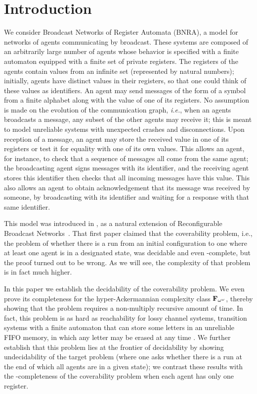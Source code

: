 \section{Introduction}

We consider Broadcast Networks of Register Automata (BNRA), a model for networks of agents communicating by broadcast. These systems are composed of an arbitrarily large number of agents whose behavior is specified with a finite automaton equipped with a finite set of private registers. The registers of the agents contain values from an infinite set (represented by natural numbers); initially, agents have distinct values in their registers, so that one could think of these values as identifiers. An agent may send messages of the form of a symbol from a finite alphabet along with the value of one of its registers. No assumption is made on the evolution of the communication graph, \emph{i.e.}, when an agents broadcasts a message, any subset of the other agents may receive it; this is meant to model unreliable systems with unexpected crashes and disconnections. Upon reception of a message, an agent may store the received value in one of its registers or test it for equality with one of its own values. 
This allows an agent, for instance, to check that a sequence of messages all come from the same agent; the broadcasting agent signs messages with its identifier, and the receiving agent stores this identifier then checks that all incoming messages have this value. This also allows an agent to obtain acknowledgement that its message was received by someone, by broadcasting with its identifier and waiting for a response with that same identifier.

This model was introduced in \cite{DelzannoST13}, as a natural extension of Reconfigurable Broadcast Networks~\cite{DelzannoSZ2010Adhoc}. That first paper claimed that the coverability problem, i.e., the problem of whether there is a run from an initial configuration to one where at least one agent is in a designated state, was decidable and even \PSPACE-complete, but the proof turned out to be wrong. As we will see, the complexity of that problem is in fact much higher.

In this paper we establish the decidability of the coverability problem. We even prove its completeness for the hyper-Ackermannian complexity class $\mathbf{F}_{\omega^\omega}$, thereby showing that the problem requires a non-multiply recursive amount of time. In fact, this problem is as hard as reachability for lossy channel systems, transition systems with a finite automaton that can store some letters in an unreliable FIFO memory, in which any letter may be erased at any time \cite{AbdullaJ1996verif, Schnoebelen2002verifying,ChambartS08ordinal}. 
We further establish that this problem lies at the frontier of decidability by showing undecidability of the target problem (where one asks whether there is a run at the end of which all agents are in a given state); we contrast these results with the \NP-completeness of the coverability problem when each agent has only one register. 

